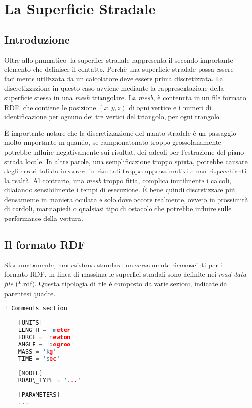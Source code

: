 \chapter{La Superficie Stradale}
\label{rdf}
%
\section{Introduzione}
Oltre allo pnumatico, la superfice stradale rappresenta il secondo importante elemento che definisce il contatto. Perchè una superficie stradale possa essere facilmente utilizzata da un calcolatore deve essere prima discretizzata. La discretizzazione in questo caso avviene mediante la rappresentazione della superficie stessa in una \textit{mesh} triangolare. La \textit{mesh}, è contenuta in un file formato \ac{RDF}, che contiene le posizione $(x,y,z)$ di ogni vertice e i numeri di identificazione per ognuno dei tre vertici del triangolo, per ogni trangolo.

È importante notare che la discretizzazione del manto stradale è un passaggio molto importante in quando, se campionatonato troppo grossolanamente potrebbe influire negativamente sui risultati dei calcoli per l'estrazione del piano strada locale. In altre parole, una semplificazione troppo spinta, potrebbe causare degli errori tali da incorrere in risultati troppo approssimativi e non rispecchianti la realtà. Al contrario, una \textit{mesh} troppo fitta, complica inutilmente i calcoli, dilatando sensibilmente i tempi di esecuzione. È bene quindi discretizzare più densamente in maniera oculata e solo dove occore realmente, ovvero in prossimità di cordoli, marciapiedi o qualsiasi tipo di ostacolo che potrebbe influire sulle performance della vettura. 
%
\section{Il formato RDF}
Sfortunatamente, non esistono standard universalmente riconosciuti per il formato RDF. In linea di massima le superfici stradali sono definite nei \textit{road data file} (*.rdf). Questa tipologia di file è composto da varie sezioni, indicate da parentesi quadre.

\begin{lstlisting}[language = C++, basicstyle=\ttfamily\small, basewidth=0.55em]
	! Comments section
	
	[UNITS]
	LENGTH = 'meter'
	FORCE = 'newton'
	ANGLE = 'degree'
	MASS = 'kg'
	TIME = 'sec'
	
	[MODEL]
	ROAD\_TYPE = '...'
	
	[PARAMETERS]
	...
\end{lstlisting}

